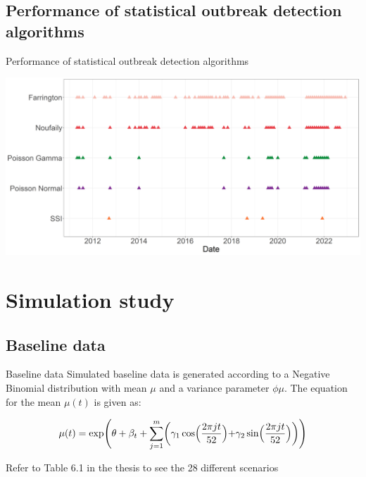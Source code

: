 \documentclass[aspectratio=169]{beamer}
\begin{document}
\hypertarget{performance-of-statistical-outbreak-detection-algorithms}{%
\subsection{Performance of statistical outbreak detection
algorithms}\label{performance-of-statistical-outbreak-detection-algorithms}}

\begin{frame}{Performance of statistical outbreak detection algorithms}
\tiny

\includegraphics[width=1\linewidth]{../figures/Compare_alarms_STEC}

\normalsize
\end{frame}

\hypertarget{simulation-study}{%
\section{Simulation study}\label{simulation-study}}

\hypertarget{baseline-data}{%
\subsection{Baseline data}\label{baseline-data}}

\begin{frame}{Baseline data}
Simulated baseline data is generated according to a Negative Binomial
distribution with mean \(\mu\) and a variance parameter \(\phi\mu\). The
equation for the mean \(\mu(t)\) is given as:

\begin{equation}
\mu(t)=\exp\Biggl(\theta+\beta_t+\sum_{j=1}^m \biggl(\gamma_1 \cos\Bigl(\frac{2\pi jt}{52}\Bigl) + \gamma_2 \sin \Bigl(\frac{2\pi jt}{52} \Bigl)\biggl)\Biggl)
\end{equation}

\vspace{.3cm}

Refer to Table 6.1 in the thesis to see the 28 different scenarios
\end{frame}
\end{document}
